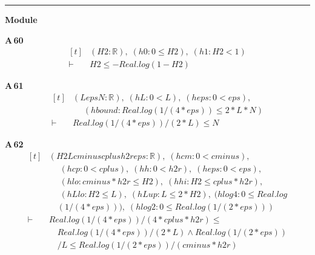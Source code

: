 \vspace{4pt}\noindent\rule{\columnwidth}{0.4pt}\par\vspace{2pt}
\noindent\textbf{Module }\par\vspace{3pt}

\noindent\textbf{A\,60}\quad{}
{\footnotesize\[ \begin{aligned}[t]
&(\mathit{H2} : \mathbb{R} ),\; (\mathit{h0} : 0 \leq \mathit{H2}),\; (\mathit{h1} : \mathit{H2} < 1)\\
\vdash\;&\mathit{H2} \leq -\mathit{Real}.\mathit{log} (1 - \mathit{H2})
\end{aligned} \]}

\noindent\textbf{A\,61}\quad{}
{\footnotesize\[ \begin{aligned}[t]
&(\mathit{L} \mathit{eps} \mathit{N} : \mathbb{R} ),\; (\mathit{hL} : 0 < \mathit{L}),\; (\mathit{heps} : 0 < \mathit{eps}),\\
&\quad \; (\mathit{hbound} : \mathit{Real}.\mathit{log} (1/(4*\mathit{eps})) \leq 2*\mathit{L}*\mathit{N})\\
\vdash\;&\mathit{Real}.\mathit{log} (1/(4*\mathit{eps}))/(2*\mathit{L}) \leq \mathit{N}
\end{aligned} \]}

\noindent\textbf{A\,62}\quad{}
{\footnotesize\[ \begin{aligned}[t]
&(\mathit{H2} \mathit{L} \mathit{cminus} \mathit{cplus} \mathit{h2r} \mathit{eps} : \mathbb{R} ),\; (\mathit{hcm} : 0 < \mathit{cminus}),\\
&\quad \; (\mathit{hcp} : 0 < \mathit{cplus}),\; (\mathit{hh} : 0 < \mathit{h2r}),\; (\mathit{heps} : 0 < \mathit{eps}),\\
&\quad \; (\mathit{hlo} : \mathit{cminus} * \mathit{h2r} \leq \mathit{H2}),\; (\mathit{hhi} : \mathit{H2} \leq \mathit{cplus} * \mathit{h2r}),\\
&\quad \; (\mathit{hLlo} : \mathit{H2} \leq \mathit{L}),\; (\mathit{hLup} : \mathit{L} \leq 2*\mathit{H2}),\; (\mathit{hlog4} : 0 \leq \mathit{Real}.\mathit{log}\\
&\quad (1/(4*\mathit{eps}))),\; (\mathit{hlog2} : 0 \leq \mathit{Real}.\mathit{log} (1/(2*\mathit{eps})))\\
\vdash\;&\mathit{Real}.\mathit{log} (1/(4*\mathit{eps}))/(4*\mathit{cplus}*\mathit{h2r}) \leq\\
&\quad \mathit{Real}.\mathit{log} (1/(4*\mathit{eps}))/(2*\mathit{L}) \wedge \mathit{Real}.\mathit{log} (1/(2*\mathit{eps}))\\
&\quad /\mathit{L} \leq \mathit{Real}.\mathit{log} (1/(2*\mathit{eps}))/(\mathit{cminus}*\mathit{h2r})
\end{aligned} \]}

